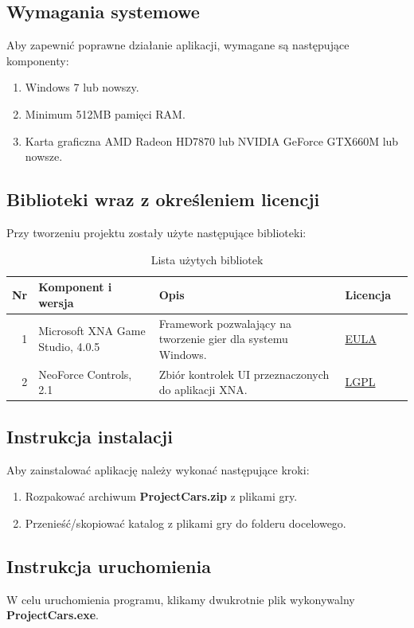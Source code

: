 \documentclass[10pt,a4paper]{article}
\begin{document}
\subsection{Wymagania systemowe}
Aby zapewnić poprawne działanie aplikacji, wymagane są następujące komponenty:
\begin{enumerate}
	\item Windows 7 lub nowszy.
	\item Minimum 512MB pamięci RAM.
	\item Karta graficzna AMD Radeon HD7870 lub NVIDIA GeForce GTX660M lub nowsze.
\end{enumerate}

\subsection{Biblioteki wraz z określeniem licencji}
Przy tworzeniu projektu zostały użyte następujące biblioteki:

\begin{table}[H]
	\begin{tabularx}{\textwidth}{|r|l|X|l|c|}
		\hline
		\textbf{Nr} & \textbf{Komponent i wersja} & \textbf{Opis} & \textbf{Licencja} & \\
		\hline
		1 & 
		Microsoft XNA Game Studio, 4.0.5 &
		Framework pozwalający na tworzenie gier dla systemu Windows. &
		\mbox{\hyperref[abbr:eula]{EULA}} &
		\cite{xna} \\
		\hline
		2 &
		NeoForce Controls, 2.1 &
		Zbiór kontrolek UI przeznaczonych do aplikacji XNA. &
		\mbox{\hyperref[abbr:lgpl]{LGPL}} &
		\cite{neoforce} \\
		\hline
	\end{tabularx}
	\caption{Lista użytych bibliotek}
\end{table}

\subsection{Instrukcja instalacji}
Aby zainstalować aplikację należy wykonać następujące kroki:
\begin{enumerate}
	\item Rozpakować archiwum \textbf{ProjectCars.zip} z plikami gry.
	\item Przenieść/skopiować katalog z plikami gry do folderu docelowego.
\end{enumerate}

\subsection{Instrukcja uruchomienia}
W celu uruchomienia programu, klikamy dwukrotnie plik wykonywalny \textbf{ProjectCars.exe}.
\end{document}
